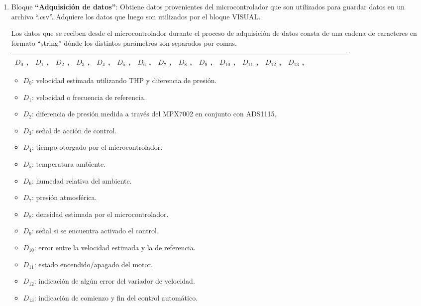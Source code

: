 \begin{enumerate}
\item Bloque \textbf{“Adquisición de datos”}: 
\subitem Obtiene datos provenientes del microcontrolador que son utilizados para guardar datos en un archivo “.csv”. 
\subitem Adquiere los datos que luego son utilizados por el bloque VISUAL.
 
Los datos que se reciben desde el microcontrolador durante el proceso de adquisición de datos consta de una cadena de caracteres en formato “string” dónde los distintos parámetros son separados por comas.
\begin{table}[h]
	\centering
	\begin{tabular}{|l|l|l|l|l|l|l|l|l|l|l|l|l|l|l|l|l|l|l|l|}
		\hline
		$D_0$ , & $D_1$ , & $D_2$ , & $D_3$ , & $D_4$ , & $D_5$ , & $D_6$ ,  & $D_7$ , & $D_8$ , & $D_9$ , & $D_{10}$ , & $D_{11}$ , & $D_{12}$ , & $D_{13}$ ,  \\ \hline
	\end{tabular}
\end{table}


	\begin{itemize}
	\item $D_0$: velocidad estimada utilizando THP y diferencia de presión.
	\item 	$D_1$: velocidad o frecuencia de referencia.
	\item 	$D_2$: diferencia de presión medida a través del MPX7002 en conjunto con ADS1115.
	\item 	$D_3$: señal de acción de control.
	\item 	$D_4$: tiempo otorgado por el microcontrolador.
	\item 	$D_5$: temperatura ambiente.
	\item 	$D_6$: humedad relativa del ambiente.
	\item 	$D_7$: presión atmosférica.
	\item 	$D_8$: densidad estimada por el microcontrolador.
	\item 	$D_9$: señal si se encuentra activado el control.
	\item 	$D_10$: error entre la velocidad estimada y la de referencia.
	\item 	$D_11$: estado encendido/apagado del motor.
	\item 	$D_12$: indicación de algún error del variador de velocidad.
	\item 	$D_13$: indicación de comienzo y fin del control automático.
	\end{itemize}	



\end{enumerate}
